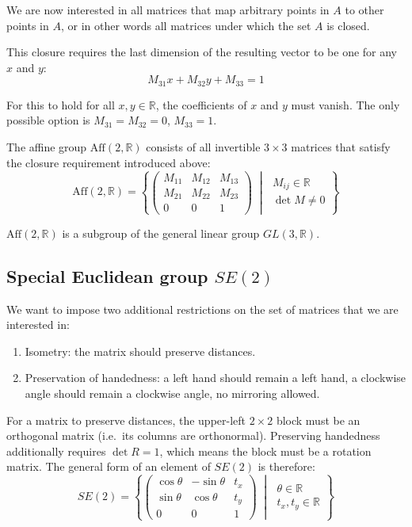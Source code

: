 \documentclass[twocolumn,10pt]{article}
\begin{document}
We are now interested in all matrices that map arbitrary points in $A$ to other points in $A$, or in other words all matrices under which the set $A$ is closed.

This closure requires the last dimension of the resulting vector to be one for any $x$ and $y$:
\[
    M_{31}x + M_{32}y + M_{33} = 1
\]

For this to hold for all $x, y \in \mathbb{R}$, the coefficients of $x$ and $y$ must vanish. The only possible option is $M_{31} = M_{32} = 0$, $M_{33} = 1$.

The affine group $\mathrm{Aff}(2, \mathbb{R})$ consists of all invertible $3 \times 3$ matrices that satisfy the closure requirement introduced above:
\[
    \mathrm{Aff}(2, \mathbb{R}) = \left\{ \begin{pmatrix} M_{11} & M_{12} & M_{13} \\ M_{21} & M_{22} & M_{23} \\ 0 & 0 & 1\end{pmatrix} \;\middle|\; \begin{gathered} M_{ij} \in \mathbb{R} \\ \det M \neq 0 \end{gathered} \right\}
\]

$\mathrm{Aff}(2, \mathbb{R})$ is a subgroup of the general linear group $GL(3, \mathbb{R})$.

\subsection{Special Euclidean group $SE(2)$}

We want to impose two additional restrictions on the set of matrices that we are interested in:
\begin{enumerate}
    \item Isometry: the matrix should preserve distances.
    \item Preservation of handedness: a left hand should remain a left hand, a clockwise angle should remain a clockwise angle, no mirroring allowed.
\end{enumerate}

For a matrix to preserve distances, the upper-left $2 \times 2$ block must be an orthogonal matrix (i.e.\ its columns are orthonormal). Preserving handedness additionally requires $\det R = 1$, which means the block must be a rotation matrix. The general form of an element of $SE(2)$ is therefore:
\[
    SE(2) = \left\{ \begin{pmatrix} \cos\theta & -\sin\theta & t_x \\ \sin\theta & \cos\theta & t_y \\ 0 & 0 & 1 \end{pmatrix} \;\middle|\; \begin{gathered} \theta \in \mathbb{R} \\ t_x, t_y \in \mathbb{R} \end{gathered} \right\}
\]
\end{document}
